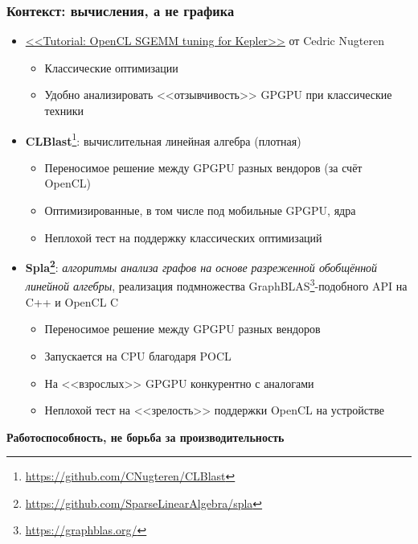 \documentclass[xcolor=table,aspectratio=169]{beamer}
\begin{document}
\begin{frame}[fragile]
  \frametitle{Контекст: вычисления, а не графика}
  \begin{itemize}
    \item \href{https://cnugteren.github.io/tutorial/pages/page1.html}{<<Tutorial: OpenCL SGEMM tuning for Kepler>>} от Cedric Nugteren
    \begin{itemize}
        \item Классические оптимизации
        \item Удобно анализировать <<отзывчивость>> GPGPU при классические техники
      \end{itemize}
    \pause
    \item  \textbf{CLBlast}\footnote{\url{https://github.com/CNugteren/CLBlast}}: вычислительная линейная алгебра (плотная)
    \begin{itemize}
      \item Переносимое решение между GPGPU разных вендоров (за счёт OpenCL)
      \item Оптимизированные, в том числе под мобильные GPGPU, ядра
      \item Неплохой тест на поддержку классических оптимизаций
    \end{itemize}
    \pause
    \item \textbf{Spla\footnote{\url{https://github.com/SparseLinearAlgebra/spla}}}: \emph{алгоритмы анализа графов на основе разреженной обобщённой линейной алгебры}, реализация подмножества GraphBLAS\footnote{\url{https://graphblas.org/}}-подобного API на C++ и OpenCL C
    \begin{itemize}
      \item Переносимое решение между GPGPU разных вендоров
      \item Запускается на CPU благодаря POCL
      \item На <<взрослых>> GPGPU конкурентно с аналогами
      \item Неплохой тест на <<зрелость>> поддержки OpenCL на устройстве
    \end{itemize}
  \end{itemize}
  \pause
  \begin{center}
    \textbf{Работоспособность, не борьба за производительность}
  \end{center}
\end{frame}
\end{document}
